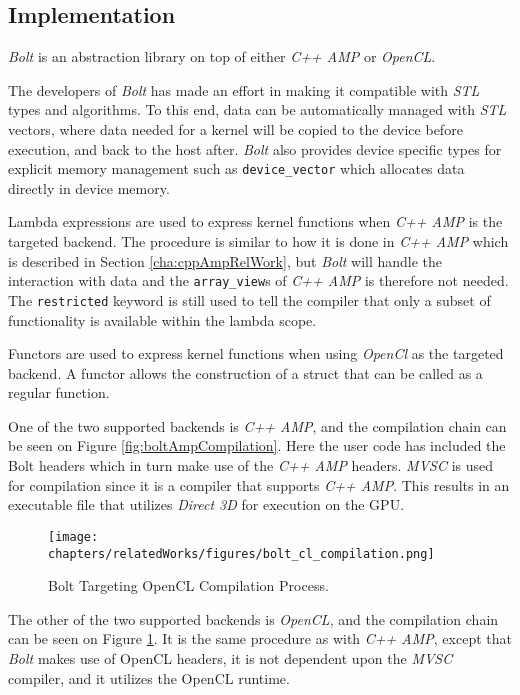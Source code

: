 \subsection{Implementation}
\textit{Bolt} is an abstraction library on top of either \textit{C++ AMP} or \textit{OpenCL}.  

The developers of \textit{Bolt} has made an effort in making it compatible with \textit{STL} types and algorithms. To this end, data can be automatically managed with \textit{STL} vectors, where data needed for a kernel will be copied to the device before execution, and back to the host after. \textit{Bolt} also provides device specific types for explicit memory management such as \texttt{device\_vector} which allocates data directly in device memory.

Lambda expressions are used to express kernel functions when \textit{C++ AMP} is the targeted backend. The procedure is similar to how it is done in \textit{C++ AMP} which is described in Section \ref{cha:cppAmpRelWork}, but \textit{Bolt} will handle the interaction with data and the \texttt{array\_view}s of \textit{C++ AMP} is therefore not needed. The \texttt{restricted} keyword is still used to tell the compiler that only a subset of functionality is available within the lambda scope.

Functors are used to express kernel functions when using \textit{OpenCl} as the targeted backend. A functor allows the construction of a struct that can be called as a regular function. 

One of the two supported backends is \textit{C++ AMP}, and the compilation chain can be seen on Figure \ref{fig:boltAmpCompilation}. Here the user code has included the Bolt headers which in turn make use of the \textit{C++ AMP} headers. \textit{MVSC} is used for compilation since it is a compiler that supports \textit{C++ AMP}. This results in an executable file that utilizes \textit{Direct 3D} for execution on the GPU.

\begin{figure}[H]
\center
\texttt{[image: chapters/relatedWorks/figures/bolt\_cl\_compilation.png]}
\caption{Bolt Targeting OpenCL Compilation Process.}
\label{fig:boltClCompilation}
\end{figure}

The other of the two supported backends is \textit{OpenCL}, and the compilation chain can be seen on Figure \ref{fig:boltClCompilation}. It is the same procedure as with \textit{C++ AMP}, except that \textit{Bolt} makes use of OpenCL headers, it is not dependent upon the \textit{MVSC} compiler, and it  utilizes the OpenCL runtime.

